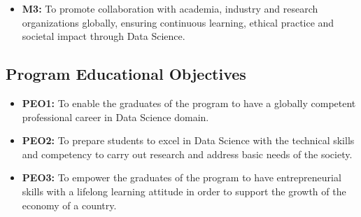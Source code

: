 \documentclass[a4paper, 12pt]{report}
\begin{document}
\begin{titlepage}
\begin{itemize}
    \item \textbf{M3:} To promote collaboration with academia, industry and research organizations globally, ensuring continuous learning, ethical practice and societal impact through Data Science.
\end{itemize}



\subsection*{Program Educational Objectives}
\begin{itemize}
    \item \textbf{PEO1:} To enable the graduates of the program to have a globally competent professional career in Data Science domain.
    
    \item \textbf{PEO2:} To prepare students to excel in Data Science with the technical skills and competency to carry out research and address basic needs of the society.
    
    \item \textbf{PEO3:} To empower the graduates of the program to have entrepreneurial skills with a lifelong learning attitude in order to support the growth of the economy of a country.
\end{itemize}
\thispagestyle{plain}

\setcounter{page}{1} %

\end{titlepage}






\end{document}
